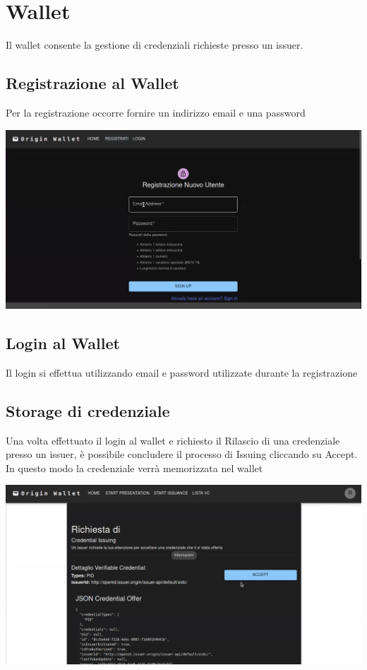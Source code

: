 \section{Wallet}
Il wallet consente la gestione di credenziali richieste presso un issuer.

\subsection{Registrazione al Wallet}
Per la registrazione occorre fornire un indirizzo email e una password
\begin{center}
\includegraphics[scale = 0.9]{./res/img/wallet/wallet_register.png}
\end{center}

\subsection{Login al Wallet}
Il login si effettua utilizzando email e password utilizzate durante la registrazione

\subsection{Storage di credenziale}
Una volta effettuato il login al wallet e richiesto il Rilascio di una credenziale presso un issuer, è possibile concludere il processo di Issuing cliccando su Accept.\\
In questo modo la credenziale verrà memorizzata nel wallet
\begin{center}
\includegraphics[scale = 0.9]{./res/img/wallet/wallet_continue_issuing.png}
\end{center}

